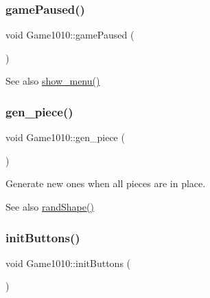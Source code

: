 \subsubsection{\texorpdfstring{game\+Paused()}{gamePaused()}}
{\footnotesize\ttfamily void Game1010\+::game\+Paused (\begin{DoxyParamCaption}{ }\end{DoxyParamCaption})\hspace{0.3cm}{\ttfamily [inline]}}

\begin{DoxySeeAlso}{See also}
\mbox{\hyperlink{class_game1010_a99d6f53c3073861fe37ef67caa073840}{show\+\_\+menu()}} 
\end{DoxySeeAlso}
\mbox{\label{class_game1010_a9576170947a355682c922cb648432b9e}} 
\subsubsection{\texorpdfstring{gen\+\_\+piece()}{gen\_piece()}}
{\footnotesize\ttfamily void Game1010\+::gen\+\_\+piece (\begin{DoxyParamCaption}{ }\end{DoxyParamCaption})\hspace{0.3cm}{\ttfamily [inline]}}



Generate new ones when all pieces are in place. 

\begin{DoxySeeAlso}{See also}
\mbox{\hyperlink{class_game1010_a9b86f7bf4ad3af111014ad33a781ffe5}{rand\+Shape()}} 
\end{DoxySeeAlso}
\mbox{\label{class_game1010_a94c89079a87b30e7f4813d40283dd4ad}} 
\subsubsection{\texorpdfstring{init\+Buttons()}{initButtons()}}
{\footnotesize\ttfamily void Game1010\+::init\+Buttons (\begin{DoxyParamCaption}{ }\end{DoxyParamCaption})\hspace{0.3cm}{\ttfamily [inline]}}

